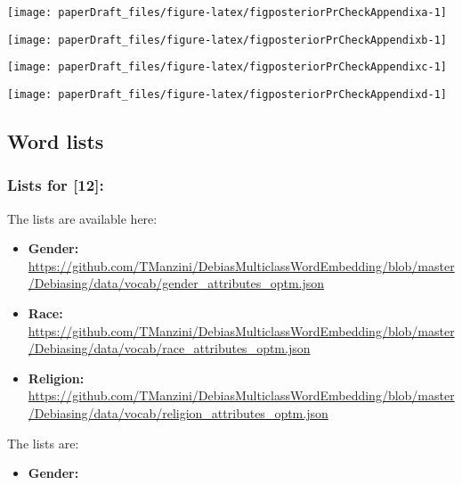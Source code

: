 \documentclass[
  10pt,
  dvipsnames,enabledeprecatedfontcommands]{scrartcl}
\providecommand{\tightlist}{%
  \setlength{\itemsep}{0pt}\setlength{\parskip}{0pt}}
\begin{document}
\begin{center}\texttt{[image: paperDraft\_files/figure-latex/figposteriorPrCheckAppendixa-1]} \end{center}

\begin{center}\texttt{[image: paperDraft\_files/figure-latex/figposteriorPrCheckAppendixb-1]} \end{center}

\begin{center}\texttt{[image: paperDraft\_files/figure-latex/figposteriorPrCheckAppendixc-1]} \end{center}

\begin{center}\texttt{[image: paperDraft\_files/figure-latex/figposteriorPrCheckAppendixd-1]} \end{center}

\hypertarget{word-lists}{%
\subsection{Word lists}\label{word-lists}}

\hypertarget{lists-for-manzini2019blacktocriminal}{%
\subsubsection{Lists for
{[}12{]}:}\label{lists-for-manzini2019blacktocriminal}}

\label{appendix:manzini_word_lists} The lists are available here:

\begin{itemize}
\item
  \textbf{Gender:}
  \url{https://github.com/TManzini/DebiasMulticlassWordEmbedding/blob/master/Debiasing/data/vocab/gender_attributes_optm.json}
\item
  \textbf{Race:}
  \url{https://github.com/TManzini/DebiasMulticlassWordEmbedding/blob/master/Debiasing/data/vocab/race_attributes_optm.json}
\item
  \textbf{Religion:}
  \url{https://github.com/TManzini/DebiasMulticlassWordEmbedding/blob/master/Debiasing/data/vocab/religion_attributes_optm.json}
\end{itemize}

The lists are:

\begin{itemize}
\tightlist
\item
  \textbf{Gender:}
\end{itemize}
\end{document}
